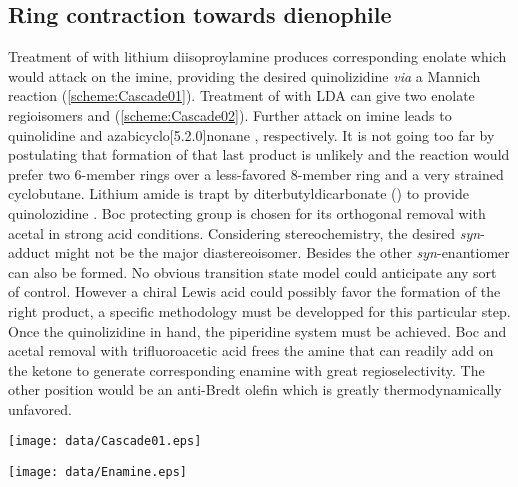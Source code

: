 \subsection*{Ring contraction towards dienophile}
Treatment of  with lithium diisoproylamine produces corresponding enolate which would attack on the imine, providing the desired quinolizidine \textit{via} a Mannich reaction (\ref{scheme:Cascade01}).
Treatment of  with LDA can give two enolate regioisomers  and  (\ref{scheme:Cascade02}). Further attack on imine leads to quinolidine  and azabicyclo[5.2.0]nonane , respectively. It is not going too far by postulating that formation of that last product is unlikely and the reaction would prefer two 6-member rings over a less-favored 8-member ring and a very strained cyclobutane. Lithium amide is trapt by diterbutyldicarbonate () to provide quinolozidine . Boc protecting group is chosen for its orthogonal removal with acetal in strong acid conditions.  Considering stereochemistry, the desired \textit{syn}-adduct might not be the major diastereoisomer. Besides the  other \textit{syn}-enantiomer can also be formed. No obvious transition state model could anticipate any sort of control. However a chiral Lewis acid could possibly favor the formation of the right product, a specific methodology must be developped for this particular step. \\
Once the quinolizidine in hand, the piperidine system must be achieved. Boc and acetal removal with trifluoroacetic acid frees the amine that can readily add on the ketone to generate corresponding enamine  with great regioselectivity. The other position would be an anti-Bredt olefin which is greatly thermodynamically unfavored.
\begin{figure''}
\centering
		\texttt{[image: data/Cascade01.eps]}	
    \label{scheme:Cascade01}
\end{figure''}
\vspace{-20pt}
\begin{figure''}
\centering
	\texttt{[image: data/Enamine.eps]}
    \label{scheme:Enamine}
\end{figure''}
